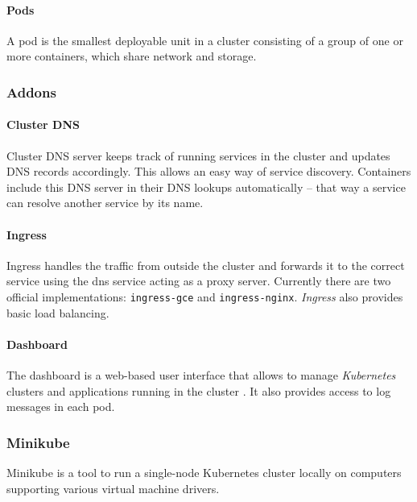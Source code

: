 \paragraph{Pods}\label{pods}

A pod is the smallest deployable unit in a cluster consisting of a group
of one or more containers, which share network and storage.
\cite{kub-pod}

\subsubsection{Addons}\label{addons}

\paragraph{Cluster DNS}\label{cluster-dns}

Cluster DNS server keeps track of running services in the cluster and
updates DNS records accordingly. This allows an easy way of service
discovery. Containers include this DNS server in their DNS lookups
automatically -- that way a service can resolve another service by its
name. \cite{baier-kub}

\paragraph{Ingress}\label{ingress}

Ingress handles the traffic from outside the cluster and forwards it to
the correct service using the dns service acting as a proxy server.
Currently there are two official implementations: \texttt{ingress-gce}
and \texttt{ingress-nginx}. \emph{Ingress} also provides basic load
balancing. \cite{kub-ingress}

\paragraph{Dashboard}\label{dashboard}

The dashboard is a web-based user interface that allows to manage
\emph{Kubernetes} clusters and applications running in the cluster
\cite{kub_comp}. It also provides access to log messages in each pod.

\subsubsection{Minikube}\label{minikube}

Minikube is a tool to run a single-node Kubernetes cluster locally on
computers supporting various virtual machine drivers.

